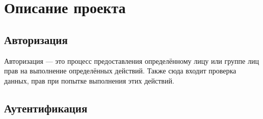 \section{Описание проекта}
\subsection{Авторизация}
Авторизация --- это процесс предоставления определённому лицу или группе лиц прав на выполнение определённых действий. Также сюда входит проверка данных, прав при попытке выполнения этих действий.



\subsection{Аутентификация}

\clearpage